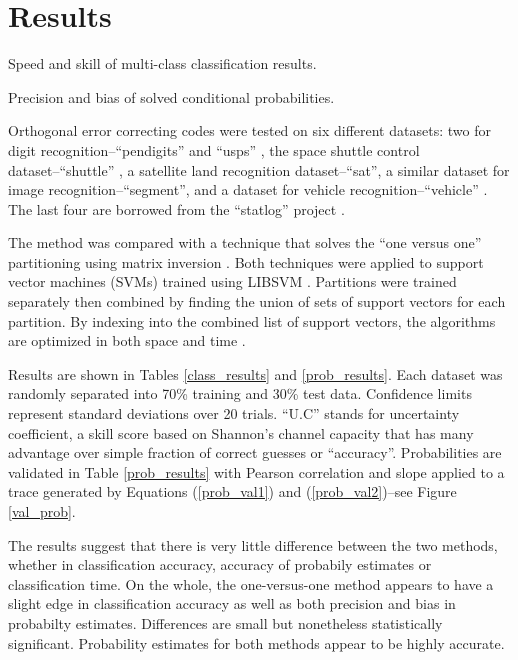 \section{Results}

\begin{table}
\caption{Speed and skill of multi-class classification results.}\label{class_results}

\caption{Precision and bias of solved conditional probabilities.}\label{prob_results}

\end{table}

Orthogonal error correcting codes were tested on six different datasets:
two for digit recognition--``pendigits'' \citep{Alimoglu1996} and
``usps'' \citep{Hull1994}, the space shuttle control dataset--``shuttle''
\citep{King_etal1995}, a satellite land recognition
dataset--``sat'', a similar dataset for image recognition--``segment'',
and a dataset for vehicle recognition--``vehicle'' \citep{Siebert1987}.
The last four are borrowed from the ``statlog'' project \citep{King_etal1995,Michie_etal1994}.

The method was compared with a technique that solves the ``one versus one'' 
partitioning using matrix inversion \citep{Wu_etal2004}.
Both techniques were applied to support vector machines (SVMs) trained using
LIBSVM \citep{Chang_Lin2011}.
Partitions were trained separately then combined by finding the union of
sets of support vectors for each partition.
By indexing into the combined list of support vectors, the algorithms are
optimized in both space and time \citep{Chang_Lin2011}.

Results are shown in Tables \ref{class_results} and \ref{prob_results}.
Each dataset was randomly separated into 70\% training and 30\%
test data.
Confidence limits represent standard deviations over 20 trials.
``U.C'' stands for uncertainty
coefficient, a skill score based on Shannon's channel capacity
\citep{Shannon,Press_etal1992,Mills2011} that has many advantage over simple
fraction of correct guesses or ``accuracy''.
Probabilities are validated in Table \ref{prob_results} with Pearson correlation and slope
applied to a trace generated by 
Equations (\ref{prob_val1}) and (\ref{prob_val2})--see Figure \ref{val_prob}.

The results suggest that there is very little difference between the two
methods, whether in classification accuracy, accuracy of probabily estimates
or classification time.
On the whole, the one-versus-one method appears to have a slight edge in
classification accuracy as well as both precision and bias in probabilty
estimates.
Differences are small but nonetheless statistically significant.
Probability estimates for both methods appear to be highly accurate.

